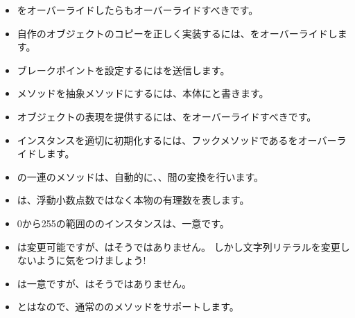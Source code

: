 \documentclass[a4paper,10pt,twoside]{book}
\begin{document}
\begin{itemize}

  \item \ct{=}をオーバーライドしたらもオーバーライドすべきです。

  \item 自作のオブジェクトのコピーを正しく実装するには、をオーバーライドします。

  \item ブレークポイントを設定するにはを送信します。

  \item メソッドを抽象メソッドにするには、本体にと書きます。

  \item オブジェクトの表現を提供するには、をオーバーライドすべきです。

  \item インスタンスを適切に初期化するには、フックメソッドであるをオーバーライドします。

  \item {}の一連のメソッドは、自動的に、、間の変換を行います。

  \item {}は、浮動小数点数ではなく本物の有理数を表します。

  \item 0から255の範囲ののインスタンスは、一意です。

  \item {}は変更可能ですが、はそうではありません。
  しかし文字列リテラルを変更しないように気をつけましょう!

  \item {}は一意ですが、はそうではありません。

  \item {}とはなので、通常ののメソッドをサポートします。

\end{itemize}

\ifx\wholebook\relax\else
   
   
\end{document}
